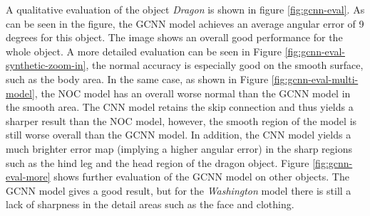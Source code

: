 A qualitative evaluation of the object \textit{Dragon} is shown in figure \ref{fig:gcnn-eval}. As can be seen in the figure, the GCNN model achieves an average angular error of 9 degrees for this object. The image shows an overall good performance for the whole object. A more detailed evaluation can be seen in Figure \ref{fig:gcnn-eval-synthetic-zoom-in}, the normal accuracy is especially good on the smooth surface, such as the body area. In the same case, as shown in Figure \ref{fig:gcnn-eval-multi-model}, the NOC model has an overall worse normal than the GCNN model in the smooth area. The CNN model retains the skip connection and thus yields a sharper result than the NOC model, however, the smooth region of the model is still worse overall than the GCNN model. In addition, the CNN model yields a much brighter error map (implying a higher angular error) in the sharp regions such as the hind leg and the head region of the dragon object. Figure \ref{fig:gcnn-eval-more} shows further evaluation of the GCNN model on other objects.
The GCNN model gives a good result, but for the \textit{Washington} model there is still a lack of sharpness in the detail areas such as the face and clothing. 



